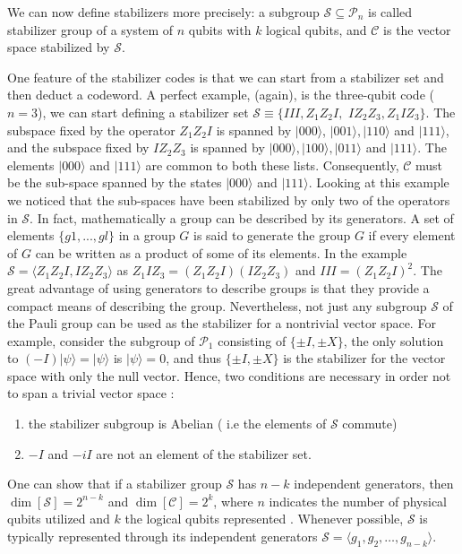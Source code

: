 We can now define stabilizers more precisely: a subgroup $\mathcal{S} \subseteq \mathcal{P}_{n}$ is called stabilizer group of a system of $n$ qubits with $k$ logical qubits, and $\mathcal{C}$ is the vector space stabilized by $\mathcal{S}$.  

One feature of the stabilizer codes is that we can start from a stabilizer set and then deduct a codeword.
A perfect example, (again), is the three-qubit code ($n=3$), we can start defining a stabilizer set $\mathcal{S} \equiv \{III,Z_1Z_2I,$ $IZ_2Z_3,Z_1IZ_3\}$. 
The subspace fixed by the operator $Z_1Z_2I$ is spanned by $|000\rangle$, $|001\rangle,|110\rangle$ and $|111\rangle$, and the subspace fixed by $IZ_{2} Z_{3}$ is spanned by $|000\rangle,|100\rangle,|011\rangle$ and $|111\rangle$. 
The elements $|000\rangle$ and $|111\rangle$ are common to both these lists. Consequently, $\mathcal{C}$ must be the sub-space spanned by the states $|000\rangle$ and $|111\rangle$. 
Looking at this example we noticed that the sub-spaces have been stabilized by only two of the operators in $\mathcal{S}$.
In fact, mathematically a group can be described by its generators.
A set of elements $\{g1,...,gl\}$ in a group $G$ is said to generate the group $G$ if every element of $G$ can be written as a product of some of its elements. In the example $\mathcal{S}= \langle Z_1Z_2I,IZ_2Z_3\rangle$ as $Z_1IZ_3 = (Z_1Z_2I)(IZ_2Z_3)$ and $III = (Z_1Z_2I)^2$.
The great advantage of using generators to describe groups is that they provide a compact means of describing the group.
Nevertheless, not just any subgroup $\mathcal{S}$ of the Pauli group can be used as the stabilizer for a nontrivial vector space. For example, consider the subgroup of $\mathcal{P}_{1}$ consisting of $\{\pm I, \pm X\}$, the only solution to $(-I)|\psi\rangle=|\psi\rangle$ is $|\psi\rangle=0$, and thus $\{\pm I, \pm X\}$ is the stabilizer for the vector space with only the null vector. Hence, two conditions are necessary in order not to span a trivial vector space :
\begin{enumerate}
    \item the stabilizer subgroup is Abelian ( i.e the elements of $\mathcal{S}$ commute)
    \item $-I$ and $-iI$ are not an element of the stabilizer set.
\end{enumerate}  

 
One can show that if a stabilizer group $\mathcal{S}$ has $n-k$ independent generators, then $\operatorname{dim}[\mathcal{S}]=2^{n-k}$ and $\operatorname{dim}\left[\mathcal{C}\right]=2^{k}$, where $n$ indicates the number of physical qubits utilized and $k$ the logical qubits represented \cite{gottesman1997stabilizer} \cite{brun2019quantum}. 
Whenever possible, $\mathcal{S}$ is typically represented through its independent generators $\mathcal{S}=\langle g_{1}, g_{2}, \ldots, g_{n-k}\rangle$.





